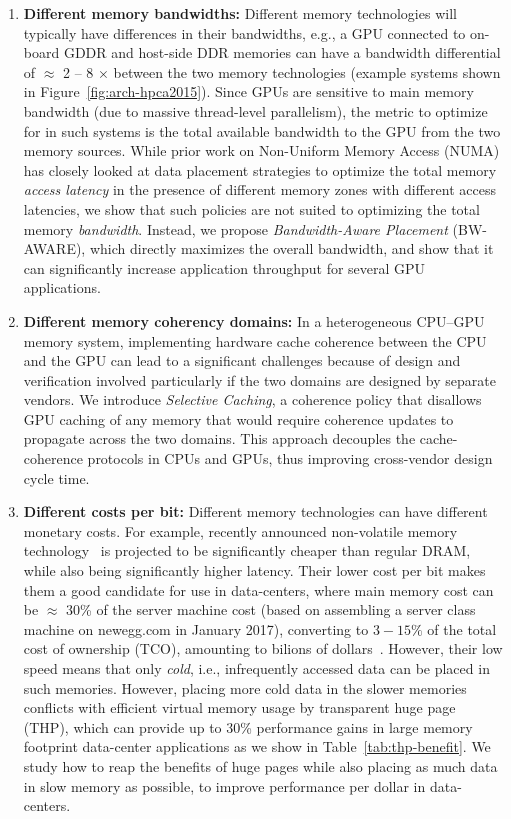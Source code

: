\begin{enumerate}
\item
\textbf{Different memory bandwidths:}
Different memory technologies will typically have differences in their
bandwidths, e.g., a GPU connected to on-board GDDR and host-side DDR memories
can have a bandwidth differential of $\approx$ 2 -- 8 $\times$ between the two
memory technologies (example systems shown in Figure~\ref{fig:arch-hpca2015}).
Since GPUs are sensitive to main memory bandwidth (due to massive thread-level
parallelism), the metric to optimize for in such systems is the total available
bandwidth to the GPU from the two memory sources. While prior work on
Non-Uniform Memory Access (NUMA) has closely looked at data placement strategies
to optimize the total memory {\it access latency} in the presence of different
memory zones with different access latencies, we show that such policies are not
suited to optimizing the total memory {\it bandwidth}. Instead, we propose {\it
Bandwidth-Aware Placement} (BW-AWARE), which directly maximizes the overall
bandwidth, and show that it can significantly increase application throughput
for several GPU applications.

\item
\textbf{Different memory coherency domains:} 
In a heterogeneous CPU--GPU memory system, implementing hardware cache coherence
between the CPU and the GPU can lead to a significant challenges because of
design and verification involved particularly if the two domains are designed by
separate vendors. We introduce {\it Selective Caching}, a coherence policy that
disallows GPU caching of any memory that would require coherence updates to
propagate across the two domains. This approach decouples the cache-coherence
protocols in CPUs and GPUs, thus improving cross-vendor design cycle time.

\item
\textbf{Different costs per bit:}
Different memory technologies can have different monetary costs.  For example,
recently announced non-volatile memory technology~\cite{xpoint} is projected to
be significantly cheaper than regular DRAM, while also being significantly
higher latency. Their lower cost per bit makes them a good candidate for use in
data-centers, where main memory cost can be $\approx$ 30\% of the server machine
cost (based on assembling a server class machine on newegg.com in January 2017),
converting to $3-15\%$ of the total cost of ownership (TCO), amounting to
bilions of dollars~\cite{borosso2013}. However, their low speed means that only
{\it cold}, i.e., infrequently accessed data can be placed in such memories.
However, placing more cold data in the slower memories conflicts with efficient
virtual memory usage by transparent huge page (THP), which can provide up to
30\% performance gains in large memory footprint data-center applications as we
show in Table~\ref{tab:thp-benefit}. We study how to reap the benefits of huge
pages while also placing as much data in slow memory as possible, to improve
performance per dollar in data-centers.
\end{enumerate}


